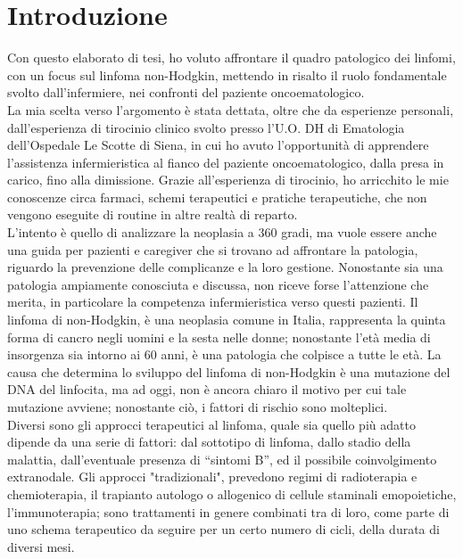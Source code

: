 \section*{Introduzione}
   
Con questo elaborato di tesi, ho voluto affrontare il quadro patologico dei linfomi, con un focus sul linfoma non-Hodgkin, 
mettendo in risalto il ruolo fondamentale svolto dall'infermiere, nei confronti del paziente oncoematologico.\\
La mia scelta verso l'argomento è stata dettata, oltre che da esperienze personali, dall'esperienza di tirocinio clinico 
svolto presso l'U.O. DH di Ematologia dell'Ospedale Le Scotte di Siena, in cui ho avuto l'opportunità di apprendere 
l'assistenza infermieristica al fianco del paziente oncoematologico, dalla presa in carico, fino alla dimissione. 
Grazie all'esperienza di tirocinio, ho arricchito le mie conoscenze circa farmaci, 
schemi terapeutici e pratiche terapeutiche, che non vengono eseguite di routine in altre realtà di reparto.\\ 
L'intento è quello di analizzare la neoplasia a 360 gradi, ma vuole essere anche 
una guida per pazienti e caregiver che si trovano ad affrontare la patologia, riguardo la prevenzione delle 
complicanze e la loro gestione. Nonostante sia una patologia ampiamente conosciuta e discussa,
non riceve forse l'attenzione che merita, in particolare la competenza infermieristica verso questi pazienti.
Il linfoma di non-Hodgkin, è una neoplasia comune in Italia, rappresenta la quinta forma di cancro negli uomini e la 
sesta nelle donne; nonostante l'età media di insorgenza sia intorno ai 60 anni, è una patologia che colpisce a tutte 
le età. La causa che determina lo sviluppo del linfoma di non-Hodgkin è una mutazione del DNA del linfocita, ma ad 
oggi, non è ancora chiaro il motivo per cui tale mutazione avviene; nonostante ciò, i fattori di rischio sono molteplici.\\
Diversi sono gli approcci terapeutici al linfoma, quale sia quello più adatto dipende da una serie di fattori:
dal sottotipo di linfoma, dallo stadio della malattia, dall’eventuale presenza di “sintomi B”, ed il possibile 
coinvolgimento extranodale. Gli approcci "tradizionali", prevedono regimi di radioterapia e chemioterapia,
il trapianto autologo o allogenico di cellule staminali emopoietiche, l'immunoterapia; sono trattamenti in genere 
combinati tra di loro, come parte di uno schema terapeutico da seguire per un certo numero di cicli, 
della durata di diversi mesi.\\
